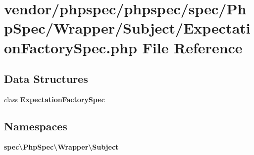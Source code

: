 \section{vendor/phpspec/phpspec/spec/\+Php\+Spec/\+Wrapper/\+Subject/\+Expectation\+Factory\+Spec.php File Reference}
\label{_expectation_factory_spec_8php}
\subsection*{Data Structures}
\begin{DoxyCompactItemize}
\item 
class {\bf Expectation\+Factory\+Spec}
\end{DoxyCompactItemize}
\subsection*{Namespaces}
\begin{DoxyCompactItemize}
\item 
 {\bf spec\textbackslash{}\+Php\+Spec\textbackslash{}\+Wrapper\textbackslash{}\+Subject}
\end{DoxyCompactItemize}
